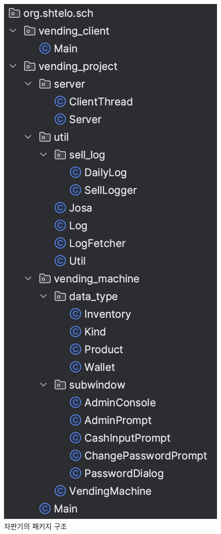 \documentclass{oblivoir}
\begin{document}
    \begin{figure}[h]
        \centering
        \includegraphics[height=0.5\textheight]{class-tree.png}
        \caption{자판기의 패키지 구조}
        \label{fig:uml}
    \end{figure}
\end{document}
